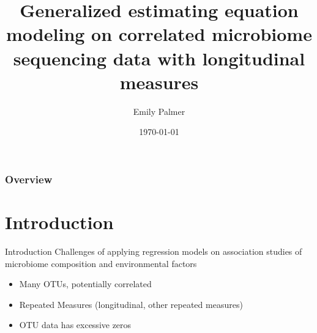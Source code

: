 \documentclass{beamer}
\title[Short title]{Generalized estimating equation modeling on correlated microbiome sequencing data with longitudinal measures } %
\author{Emily Palmer} %
\institute[OSU] %
{
Journal Club, Oregon State University  %
}
\date{\today} %
\begin{document}
\begin{frame}
\titlepage %
\end{frame}

\begin{frame}
\frametitle{Overview} %
\tableofcontents %
\end{frame}


\section{Introduction} %


\begin{frame}[t]{Introduction}
  Challenges of applying regression models on association studies of microbiome composition and environmental factors
  \begin{itemize}
    \item Many OTUs, potentially correlated
    \item Repeated Measures (longitudinal, other repeated measures)
    \item OTU data has excessive zeros
  \end{itemize}
\end{frame}
\end{document}
